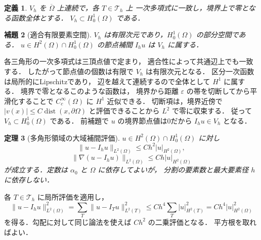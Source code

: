 \documentclass[a5paper,10pt,onecolumn]{jsarticle}
\makeatletter
\theoremstyle{mathnotetheorem}
\newtheorem{theorem}{定理}[section]
\newtheorem{definition}[theorem]{定義}
\newtheorem{lemma}[theorem]{補題}
\renewcommand{\proofname}{証明}
\renewenvironment{proof}[1][\proofname]{%
  \par\pushQED{\qed}\normalfont\topsep4\p@\@plus2\p@\relax
  \trivlist\item[\hskip\labelsep\bfseries #1]\ignorespaces
}{\popQED\endtrivlist\@endpefalse}
\newcommand{\norm}[1]{\lVert #1\rVert}
\makeatother
\begin{document}
\begin{definition}
$V_h$ を $\overline\Omega$ 上連続で，各 $T\in\mathcal T_h$ 上
一次多項式に一致し，境界上で零となる函数全体とする．
$V_h\subset H_0^1(\Omega)$ である．
\end{definition}

\begin{lemma}[適合有限要素空間]
$V_h$ は有限次元であり，$H_0^1(\Omega)$ の部分空間である．
$u\in H^2(\Omega)\cap H_0^1(\Omega)$ の節点補間 $I_hu$ は
$V_h$ に属する．
\end{lemma}
\begin{proof}
各三角形の一次多項式は三頂点値で定まり，
適合性によって共通辺上でも一致する．
したがって節点値の個数は有限で $V_h$ は有限次元となる．
区分一次函数は局所的にLipschitzであり，
辺を越えて連続するので全体として $H^1$ に属する．
境界で零となるこのような函数は，
境界から距離 $\varepsilon$ の帯を切断してから平滑化することで
$C_c^\infty(\Omega)$ に $H^1$ 近似できる．
切断項は，境界近傍で $|v(x)|\le C\operatorname{dist}(x,\partial\Omega)$
と評価できることから $L^2$ で零に収束する．
従って $V_h\subset H_0^1(\Omega)$ である．
前補題で $u$ の境界節点値は0だから $I_hu\in V_h$ となる．
\end{proof}

\begin{theorem}[多角形領域の大域補間評価]
$u\in H^2(\Omega)\cap H_0^1(\Omega)$ に対し
\[
 \norm{u-I_hu}_{L^2(\Omega)}\le Ch^2|u|_{H^2(\Omega)},
\]
\[
 \norm{\nabla(u-I_hu)}_{L^2(\Omega)}\le Ch|u|_{H^2(\Omega)}
\]
が成立する．定数は $\alpha_0$ と $\Omega$ に依存してよいが，
分割の要素数と最大要素径 $h$ に依存しない．
\end{theorem}
\begin{proof}
各 $T\in\mathcal T_h$ に局所評価を適用し，
\[
 \norm{u-I_hu}_{L^2(\Omega)}^2
 =\sum_T\norm{u-I_Tu}_{L^2(T)}^2
 \le C h^4\sum_T|u|_{H^2(T)}^2
 =Ch^4|u|_{H^2(\Omega)}^2
\]
を得る．勾配に対して同じ論法を使えば $Ch^2$ の二乗評価となる．
平方根を取ればよい．
\end{proof}
\end{document}
